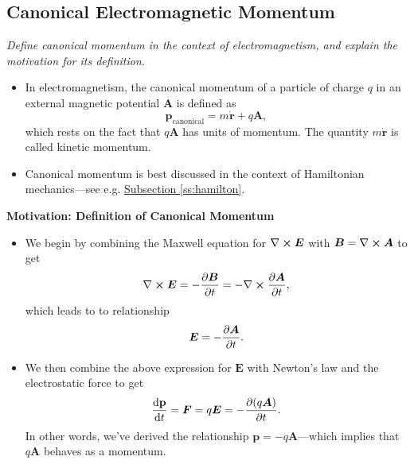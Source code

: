 \documentclass[11pt, a4paper]{article}
\renewcommand{\vec}[1]{\bm{#1}} %
\newcommand{\mat}[1]{\mathbf{#1}} %
\newcommand{\E}{\vec{E}} %
\newcommand{\B}{\vec{B}} %
\newcommand{\A}{\vec{A}} %
\renewcommand{\curl}{\nabla \cross}
\begin{document}
\subsection{Canonical Electromagnetic Momentum}
\textit{Define canonical momentum in the context of electromagnetism, and explain the motivation for its definition.}

\begin{itemize}
    \item In electromagnetism, the canonical momentum of a particle of charge $ q $ in an external magnetic potential $ \A $ is defined as
    \begin{equation*}
        \vec{p}_{\text{canonical}} = m \dot{\vec{r}} + q\A,
    \end{equation*}
    which rests on the fact that $ q\A $ has units of momentum. The quantity $ m \dot{\vec{r}} $ is called kinetic momentum.

    \item Canonical momentum is best discussed in the context of Hamiltonian mechanics---see e.g. \hyperref[ss:hamilton]{\underline{Subsection \ref{ss:hamilton}}}.

\end{itemize}

\textbf{Motivation: Definition of Canonical Momentum}
\begin{itemize}
	\item We begin by combining the Maxwell equation for $ \curl \E $ with $ \B = \curl \A $ to get
	\begin{equation*}
		\curl \E = - \pdv{\B}{t} = - \curl \pdv{\A}{t},
	\end{equation*}
	which leads to to relationship
	\begin{equation*}
		\E = - \pdv{\A}{t}.
	\end{equation*}
	\item We then combine the above expression for $ \E $ with Newton's law and the electrostatic force to get
	\begin{equation*}
		\dv{\mat{p}}{t} = \vec{F} = q \E = - \pdv{(q \A)}{t}.
	\end{equation*} 
    In other words, we've derived the relationship $ \vec{p} = - q \A $---which implies that $ q\A $ behaves as a momentum.
	
\end{itemize}
\end{document}
